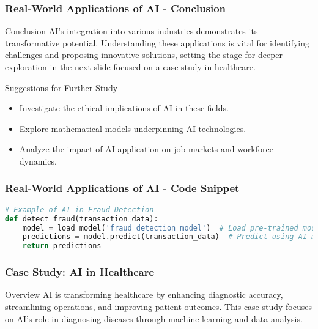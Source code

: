 \documentclass[aspectratio=169]{beamer}
\begin{document}
\begin{frame}[fragile]
    \frametitle{Real-World Applications of AI - Conclusion}
    \begin{block}{Conclusion}
        AI's integration into various industries demonstrates its transformative potential. Understanding these applications 
        is vital for identifying challenges and proposing innovative solutions, setting the stage for deeper exploration 
        in the next slide focused on a case study in healthcare.
    \end{block}

    \begin{block}{Suggestions for Further Study}
        \begin{itemize}
            \item Investigate the ethical implications of AI in these fields.
            \item Explore mathematical models underpinning AI technologies.
            \item Analyze the impact of AI application on job markets and workforce dynamics.
        \end{itemize}
    \end{block}
\end{frame}

\begin{frame}[fragile]
    \frametitle{Real-World Applications of AI - Code Snippet}
    \begin{lstlisting}[language=Python]
# Example of AI in Fraud Detection
def detect_fraud(transaction_data):
    model = load_model('fraud_detection_model')  # Load pre-trained model
    predictions = model.predict(transaction_data)  # Predict using AI model
    return predictions
    \end{lstlisting}
\end{frame}

\begin{frame}[fragile]
    \frametitle{Case Study: AI in Healthcare}
    \begin{block}{Overview}
        AI is transforming healthcare by enhancing diagnostic accuracy, streamlining operations, and improving patient outcomes. This case study focuses on AI's role in diagnosing diseases through machine learning and data analysis.
    \end{block}
\end{frame}
\end{document}
